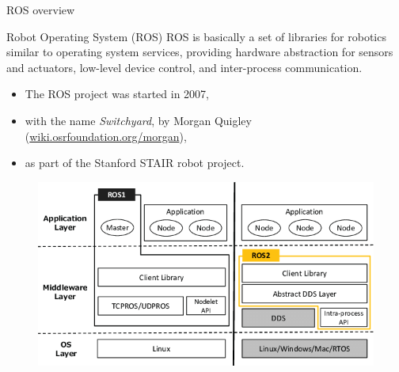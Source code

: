\begin{frame}[allowframebreaks]{ROS overview}
 \begin{block}{Robot Operating System (ROS)}
 ROS is basically a set of libraries for robotics similar to operating system services, providing hardware abstraction for sensors and actuators, low-level device control, and inter-process communication. 
 \end{block}
 
 \begin{itemize}
  \item The ROS project was started in 2007, 
  \item with the name \textit{Switchyard}, by Morgan Quigley (\url{wiki.osrfoundation.org/morgan}), 
  \item as part of the Stanford STAIR robot project. 
 \end{itemize}
 


  \framebreak
 \begin{figure}
  \includegraphics[width=.7\textwidth]{./img/ros/ROS1-ROS2-architecture.png}
 \end{figure}

 


\end{frame}
